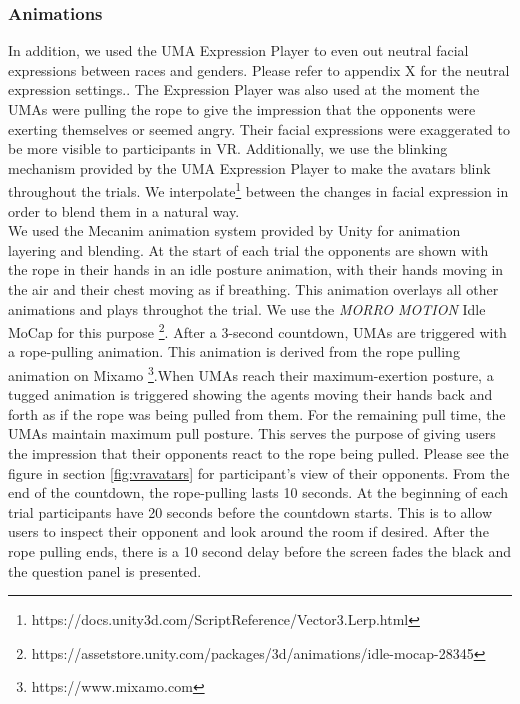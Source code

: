 \subsubsection{Animations}
\label{subsection:animation}
 In addition, we used the UMA Expression Player to even out neutral facial expressions between races and genders. Please refer to appendix X for the neutral expression settings.. The Expression Player was also used at the moment the UMAs were pulling the rope to give the impression that the opponents were exerting themselves or seemed angry. Their facial expressions were exaggerated to be more visible to participants in VR. Additionally, we use the blinking mechanism provided by the UMA Expression Player to make the avatars blink throughout the trials. We interpolate\footnote{https://docs.unity3d.com/ScriptReference/Vector3.Lerp.html} between the changes in facial expression in order to blend them in a natural way.
\\
We used the Mecanim animation system provided by Unity for animation layering and blending. At the start of each trial the opponents are shown with the rope in their hands in an idle posture animation, with their hands moving in the air and their chest moving as if breathing. This animation overlays all other animations and plays throughot the trial. We use the \textit{MORRO MOTION} Idle MoCap for this purpose \footnote{https://assetstore.unity.com/packages/3d/animations/idle-mocap-28345}. After a 3-second countdown, UMAs are triggered with a rope-pulling animation. This animation is derived from the rope pulling animation on Mixamo \footnote{https://www.mixamo.com}.When UMAs reach their maximum-exertion posture, a tugged animation is triggered showing the agents moving their hands back and forth as if the rope was being pulled from them. For the remaining pull time, the UMAs maintain maximum pull posture. This serves the purpose of giving users the impression that their opponents react to the rope being pulled. Please see the figure in section \ref{fig:vravatars} for participant's view of their opponents. From the end of the countdown, the rope-pulling lasts 10 seconds. At the beginning of each trial participants have 20 seconds before the countdown starts. This is to allow users to inspect their opponent and look around the room if desired. After the rope pulling ends, there is a 10 second delay before the screen fades the black and the question panel is presented. 
